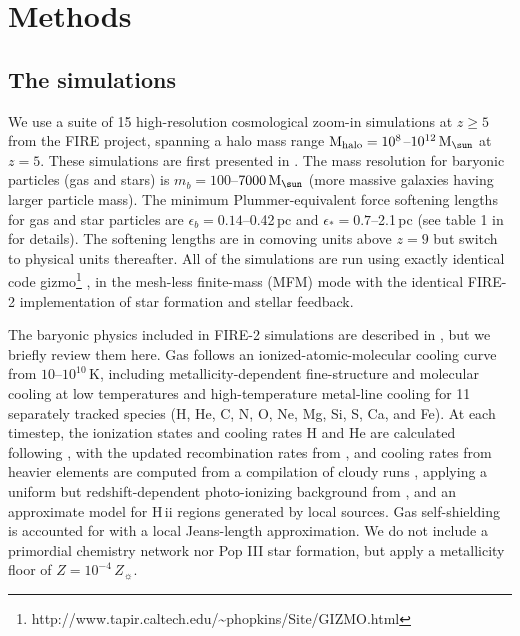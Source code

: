 \documentclass[useAMS,usenatbib]{mn2e}
\newcommand{\Mhalo}{{\rm M}_{\rm halo}}
\newcommand{\Msun}{{\rm M}_{\sun}}
\newcommand{\Zsun}{Z_{\sun}}
\newcommand{\mb}{m_b}
\newcommand{\eb}{\epsilon_b}
\newcommand{\es}{\epsilon_{\ast}}
\begin{document}
\section{Methods}
\label{sec:methods}

\subsection{The simulations}
\label{sec:sim}
We use a suite of 15 high-resolution cosmological zoom-in simulations at $z\geq5$ from the FIRE project, spanning a halo mass range $\Mhalo=10^8$--$10^{12}\,\Msun$ at $z=5$. These simulations are first presented in \citet{ma.2017:fire.hiz.smf}. The mass resolution for baryonic particles (gas and stars) is $\mb=100$--$7000\,\Msun$ (more massive galaxies having larger particle mass). The minimum Plummer-equivalent force softening lengths for gas and star particles are $\eb=0.14$--0.42\,pc and $\es=0.7$--2.1\,pc (see table 1 in \citealt{ma.2017:fire.hiz.smf} for details). The softening lengths are in comoving units above $z=9$ but switch to physical units thereafter. All of the simulations are run using exactly identical code {\sc gizmo}\footnote{http://www.tapir.caltech.edu/{\textasciitilde}phopkins/Site/GIZMO.html} \citep{hopkins.2015:gizmo.code}, in the mesh-less finite-mass (MFM) mode with the identical FIRE-2 implementation of star formation and stellar feedback.

The baryonic physics included in FIRE-2 simulations are described in \citet{hopkins.2017:fire2.numerics}, but we briefly review them here. Gas follows an ionized-atomic-molecular cooling curve from $10$--$10^{10}$\,K, including metallicity-dependent fine-structure and molecular cooling at low temperatures and high-temperature metal-line cooling for 11 separately tracked species (H, He, C, N, O, Ne, Mg, Si, S, Ca, and Fe). At each timestep, the ionization states and cooling rates H and He are calculated following \citet{katz.1996:sph.cooling}, with the updated recombination rates from \citet{verner.1996:recombination.rates}, and cooling rates from heavier elements are computed from a compilation of {\sc cloudy} runs \citep{ferland.2013:cloudy.release}, applying a uniform but redshift-dependent photo-ionizing background from \citet{cafg.2009:uvb}, and an approximate model for H\,{\sc ii} regions generated by local sources. Gas self-shielding is accounted for with a local Jeans-length approximation. We do not include a primordial chemistry network nor Pop III star formation, but apply a metallicity floor of $Z=10^{-4}\,\Zsun$.
\end{document}

